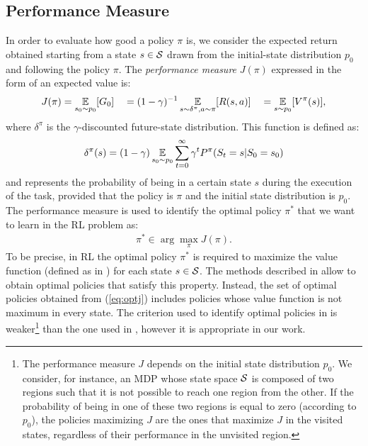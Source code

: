 \subsection{Performance Measure}
In order to evaluate how good a policy $\pi$ is, we consider the expected return obtained starting from a state $s \in \mathcal{S}$ drawn from the initial-state distribution $p_0$ and following the policy $\pi$. The \emph{performance measure} $J(\pi)$ expressed in the form of an expected value is:
\begin{align} J(\pi) = \operatorname*{\mathbb{E}}_{s_0\sim p_0}[G_0] \quad = (1 - \gamma)^{-1}\operatorname*{\mathbb{E}}_{s\sim\delta^{\pi}, a \sim \pi}[R(s,a)] \quad = \operatorname*{\mathbb{E}}_{s\sim p_0}[V^{\pi}(s)], \end{align}
where $\delta^{\pi}$ is the $\gamma$-discounted future-state distribution. This function is defined as:
\begin{align} \delta^{\pi}(s) = (1 - \gamma)\operatorname*{\mathbb{E}}_{s_{0}\sim p_0}\sum_{t=0}^{\infty}\gamma^t P^{\pi}(S_t = s|S_0=s_0) \end{align}
and represents the probability of being in a certain state $s$ during the execution of the task, provided that the policy is $\pi$ and the initial state distribution is $p_0$.\\
\newline
The performance measure is used to identify the optimal policy $\pi^{*}$ that we want to learn in the \ac{RL} problem as:
\begin{align} \pi^{*} \in \arg \max_{\pi} J(\pi). \label{eq:optj}\end{align}
To be precise, in \ac{RL} the optimal policy $\pi^{*}$ is required to maximize the value function (defined as in ) for each state $s \in \mathcal{S}$. The methods described in  allow to obtain optimal policies that satisfy this property. Instead, the set of optimal policies obtained from (\ref{eq:optj}) includes policies whose value function is not maximum in every state. The criterion used to identify optimal policies in  is weaker\footnote{The performance measure $J$ depends on the initial state distribution $p_0$. We consider, for instance, an \ac{MDP} whose state space $\mathcal{S}$ is composed of two regions such that it is not possible to reach one region from the other. If the probability of being in one of these two regions is equal to zero (according to $p_0$), the policies maximizing $J$ are the ones that maximize $J$ in the visited states, regardless of their performance in the unvisited region.} than the one used in , however it is appropriate in our work.

